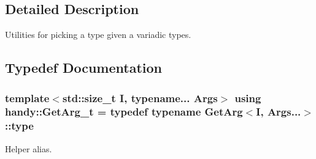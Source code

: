 \subsection{Detailed Description}
Utilities for picking a type given a variadic types. 



\subsection{Typedef Documentation}
\subsubsection[{\texorpdfstring{Get\+Arg\+\_\+t}{GetArg_t}}]{\setlength{\rightskip}{0pt plus 5cm}template$<$std\+::size\+\_\+t I, typename... Args$>$ using {\bf handy\+::\+Get\+Arg\+\_\+t} = typedef typename Get\+Arg$<$I, Args...$>$\+::type}\hypertarget{group__GetArgGroup_gaed885c745628529b328db1c511d841fc}{}\label{group__GetArgGroup_gaed885c745628529b328db1c511d841fc}


Helper alias. 

